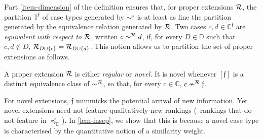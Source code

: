 \documentclass[12pt,a4paper,twoside]{article}
\newcommand{\novel}{\mathfrak f}
\newcommand{\Ext}{\operatorname{ext}}
\newcommand{\preceqb}{\mathbin{\preceq}}
\newcommand{\ext}{\mathrel{\mc R}}
\newcommand{\supext}{{\ext}}
\newcommand{\extb}{\mathbin{\mc R}}
\newcommand{\mbbd}{{\mathds D}}
\newcommand{\mbbc}{{\mathds C}}
\newcommand{\mbbcp}{{\mathds C^{\novel}}}
\newcommand{\mbbtp}{{\mathds{T} ^ \novel }}
\begin{document}
Part \ref{item-dimension} of the definition ensures that, for proper extensions
$\ext $, the partition $\mbbtp$ of case types generated by $\sim^{\star}$ is at
least as fine the partition generated by the equivalence relation generated by
$ \ext$. Two cases $ c,d \in \mbbcp $ are \emph{equivalent with respect to
  $ \ext $}, written $ c \sim^{\extb} d $, if, for every $ D \in \mbbd $ such
that $ c,d \notin D $, $ \extb _ { D \cup \{c\} } = \extb _ { D \cup\{d\} }$.
This notion allows us to partition the set of proper extensions as follows.


\begin{definition*}\label{def-novel}

  A proper extension $\ext $ is either \emph{regular} or \emph{novel}.  It is
  novel whenever $[\novel]$ is a distinct equivalence class of $\sim^{\supext}$,
  so that, for every $ c \in \mbbc $, $ c \nsim ^ \supext \novel $.

\end{definition*}



For novel extensions, $\novel $ mimmicks the potential arrival of new
information. Yet novel extensions need not feature qualitatively new rankings
(\ie\ rankings that do not feature in $\preceq_{\mbbd}$). In \cref{lem-insep},
we show that this is because a novel case type is characterised by the
quantitative notion of a similarity weight.
\end{document}
